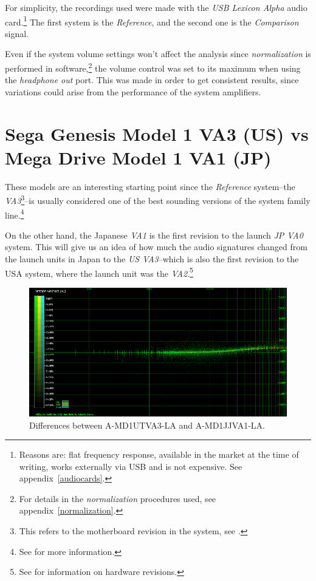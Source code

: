 \documentclass[10pt,a4paper]{report}
\begin{document}
For simplicity, the recordings used were made with the \textit{USB Lexicon Alpha} audio card.\footnote{Reasons are: flat frequency response, available in the market at the time of writing, works externally via USB and is not expensive. See appendix~\ref{audiocards}.} The first system is the \textit{Reference}, and the second one is the \textit{Comparison} signal.

Even if the system volume settings won't affect the analysis since \textit{normalization} is performed in software,\footnote{For details in the \textit{normalization} procedures used, see appendix~\ref{normalization}.} the volume control was set to its maximum when using the \textit{headphone out} port. This was made in order to get consistent results, since variations could arise from the performance of the system amplifiers.

\section{Sega Genesis Model 1 VA3 (US) vs\\ Mega Drive Model 1 VA1 (JP)}

These models are an interesting starting point since the \textit{Reference} system--the \textit{VA3}\footnote{This refers to the motherboard revision in the system, see \cite{genesisaudio}.}--is usually considered one of the best sounding versions of the system family line.\footnote{See \cite{genesisaudio2} for more information.}

On the other hand, the Japanese \textit{VA1} is the first revision to the launch \textit{JP VA0} system. This will give us an idea of how much the audio signatures changed from the launch units in Japan to the \textit{US VA3}--which is also the first revision to the USA system, where the launch unit was the \textit{VA2}.\footnote{See \cite{genesishw} for information on hardware revisions.}

\begin{figure}[H]
	\centering
	\includegraphics[width=1.0\linewidth]{images/results/1-A-MD1UTVA3-LA_vs_A-MD1JJVA1-LA.png}
	\caption[A-MD1UTVA3-LA vs A-MD1JJVA1-LA]{Differences between A-MD1UTVA3-LA and A-MD1JJVA1-LA.}
	\label{fig:A-MD1UTVA3-LA_vs_A-MD1JJVA1-LA}
\end{figure}
\end{document}
